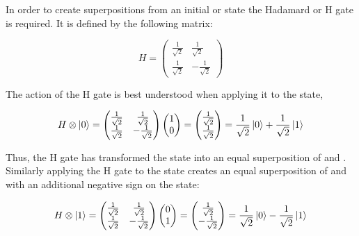 In order to create superpositions from an initial \0 or \1 state the Hadamard or H gate is required. It is defined by the following matrix:

\begin{equation}
H = \begin{pmatrix}
 \frac{1}{\sqrt{2}} & \frac{1}{\sqrt{2}} \\ 
 \frac{1}{\sqrt{2}} & -\frac{1}{\sqrt{2}}
 \end{pmatrix}
\end{equation}

The action of the H gate is best understood when applying it to the \0 state,

\begin{equation}
\label{equ:hadamardverification1}
H \otimes \ket{0} = \begin{pmatrix}
 \frac{1}{\sqrt{2}} & \frac{1}{\sqrt{2}} \\ 
 \frac{1}{\sqrt{2}} & -\frac{1}{\sqrt{2}}
 \end{pmatrix} \begin{pmatrix}
 1 \\ 
 0
 \end{pmatrix} = \begin{pmatrix}
 \frac{1}{\sqrt{2}} \\ 
 \frac{1}{\sqrt{2}}
 \end{pmatrix} = \frac{1}{\sqrt{2}} \ket{0} + \frac{1}{\sqrt{2}} \ket{1}
\end{equation}

Thus, the H gate has transformed the \0 state into an equal superposition of \0 and \1. Similarly applying the H gate to the \1 state creates an equal superposition of \0 and \1 with an additional negative sign on the \1 state:

\begin{equation}
\label{equ:hadamardverification2}
H \otimes \ket{1} = \begin{pmatrix}
 \frac{1}{\sqrt{2}} & \frac{1}{\sqrt{2}} \\ 
 \frac{1}{\sqrt{2}} & -\frac{1}{\sqrt{2}}
 \end{pmatrix} \begin{pmatrix}
 0 \\ 
 1
 \end{pmatrix} = \begin{pmatrix}
 \frac{1}{\sqrt{2}} \\ 
 -\frac{1}{\sqrt{2}}
 \end{pmatrix} = \frac{1}{\sqrt{2}} \ket{0} - \frac{1}{\sqrt{2}} \ket{1}
\end{equation}

